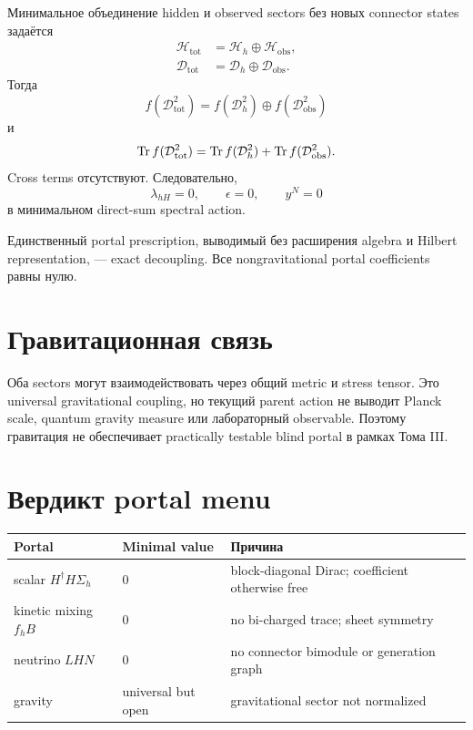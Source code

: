 Минимальное объединение hidden и observed sectors без новых connector
states задаётся
\begin{align}
 \mathcal H_{\mathrm{tot}}
 &=
 \mathcal H_h\oplus\mathcal H_{\mathrm{obs}},
 \\
 \mathcal D_{\mathrm{tot}}
 &=
 \mathcal D_h\oplus\mathcal D_{\mathrm{obs}}.
\end{align}
Тогда
\begin{equation}
 f(\mathcal D_{\mathrm{tot}}^2)
 =
 f(\mathcal D_h^2)
 \oplus
 f(\mathcal D_{\mathrm{obs}}^2)
\end{equation}
и
\begin{equation}
 \operatorname{Tr} f(\mathcal D_{\mathrm{tot}}^2)
 =
 \operatorname{Tr} f(\mathcal D_h^2)
 +
 \operatorname{Tr} f(\mathcal D_{\mathrm{obs}}^2).
\end{equation}
Cross terms отсутствуют. Следовательно,
\begin{equation}
 \lambda_{hH}=0,
 \qquad
 \epsilon=0,
 \qquad
 y^N=0
\end{equation}
в минимальном direct-sum spectral action.

\begin{theorem}
Единственный portal prescription, выводимый без расширения algebra и
Hilbert representation, --- exact decoupling. Все nongravitational portal
coefficients равны нулю.
\end{theorem}

\section{Гравитационная связь}

Оба sectors могут взаимодействовать через общий metric и stress tensor.
Это universal gravitational coupling, но текущий parent action не выводит
Planck scale, quantum gravity measure или лабораторный observable. Поэтому
гравитация не обеспечивает practically testable blind portal в рамках
Тома III.

\section{Вердикт portal menu}

\begin{center}
\begin{tabular}{p{}p{}p{}}
\toprule
Portal & Minimal value & Причина \\
\midrule
scalar \(H^\dagger H\Sigma_h\) & \(0\) & block-diagonal Dirac; coefficient otherwise free \\
kinetic mixing \(f_hB\) & \(0\) & no bi-charged trace; sheet symmetry \\
neutrino \(LH N\) & \(0\) & no connector bimodule or generation graph \\
gravity & universal but open & gravitational sector not normalized \\
\bottomrule
\end{tabular}
\end{center}


